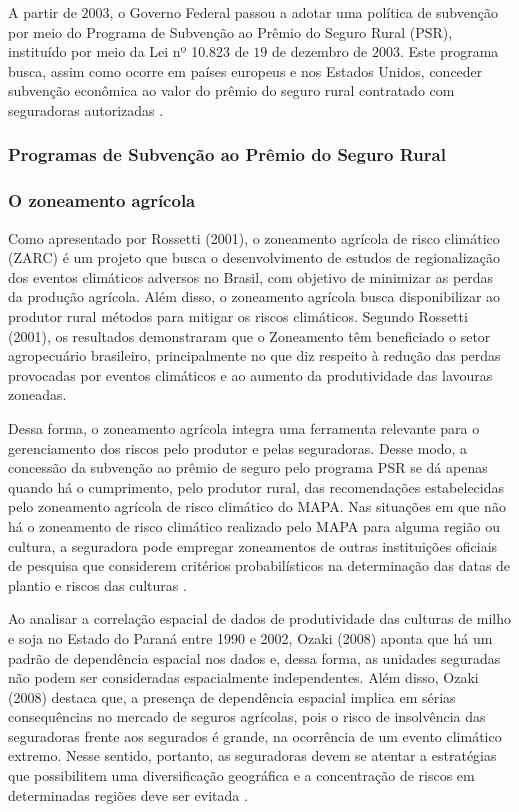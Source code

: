 \documentclass[12pt,a4paper]{article}
\begin{document}
A partir de $2003$, o Governo Federal passou a adotar uma política de subvenção por meio do Programa de Subvenção ao Prêmio do Seguro Rural (PSR), instituído por meio da Lei nº 10.823 de $19$ de dezembro de $2003$. Este programa busca, assim como ocorre em países europeus e nos Estados Unidos, conceder subvenção econômica ao valor do prêmio do seguro rural contratado com seguradoras autorizadas \cite{maia11, silva14_2}.

\subsubsection{Programas de Subvenção ao Prêmio do Seguro Rural}


\subsubsection{O zoneamento agrícola}

Como apresentado por Rossetti (2001), o  zoneamento agrícola de risco climático (ZARC) é um projeto que busca o desenvolvimento de estudos de regionalização dos eventos climáticos adversos no Brasil, com objetivo de minimizar as perdas da produção agrícola. Além disso, o zoneamento agrícola busca disponibilizar ao produtor rural métodos para mitigar os riscos climáticos. Segundo Rossetti (2001), os resultados demonstraram que o Zoneamento têm beneficiado o setor agropecuário brasileiro, principalmente no que diz respeito à redução das perdas provocadas por eventos climáticos e ao aumento da produtividade das lavouras zoneadas.

Dessa forma, o zoneamento agrícola integra uma ferramenta relevante para o gerenciamento dos riscos pelo produtor e pelas seguradoras. Desse modo, a concessão da subvenção ao prêmio de seguro pelo programa PSR se dá apenas quando há o cumprimento, pelo produtor rural, das recomendações estabelecidas pelo zoneamento agrícola de risco climático do MAPA. Nas situações em que não há o zoneamento de risco climático realizado pelo MAPA para alguma região ou cultura, a seguradora pode empregar zoneamentos de outras instituições oficiais de pesquisa que considerem critérios probabilísticos na determinação das datas de plantio e riscos das culturas \cite{santos16}. %


Ao analisar a correlação espacial de dados de produtividade das culturas de milho e soja no Estado do Paraná entre 1990 e 2002, Ozaki (2008) aponta que há um padrão de dependência espacial nos dados e, dessa forma, as unidades seguradas não podem ser consideradas espacialmente independentes. Além disso, Ozaki (2008) destaca que, a presença de dependência espacial implica em sérias consequências no mercado de seguros agrícolas, pois o risco de insolvência das seguradoras frente aos segurados é grande, na ocorrência de um evento climático extremo.  Nesse sentido, portanto, as seguradoras devem se atentar a estratégias que possibilitem uma diversificação geográfica e a concentração de riscos em determinadas regiões deve ser evitada \cite{ozaki08}. 
\end{document}
